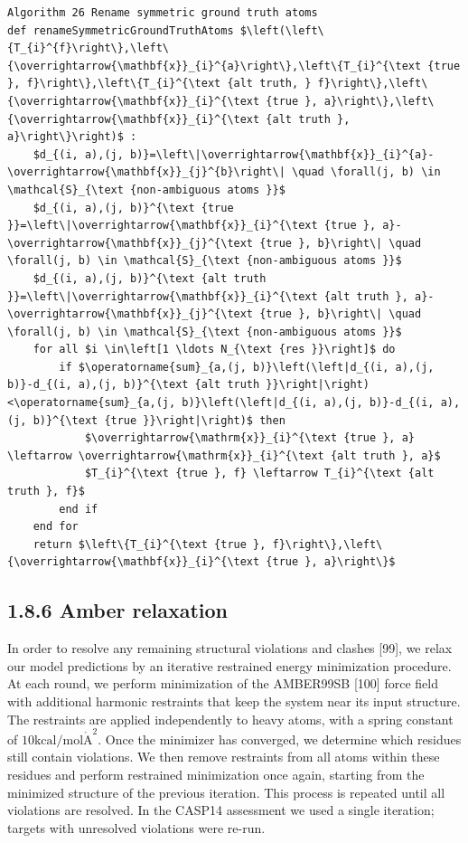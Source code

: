 \documentclass[10pt]{article}
\def\AA{\mathring{\mathrm{A}}}
\begin{document}
\begin{verbatim}
Algorithm 26 Rename symmetric ground truth atoms
def renameSymmetricGroundTruthAtoms $\left(\left\{T_{i}^{f}\right\},\left\{\overrightarrow{\mathbf{x}}_{i}^{a}\right\},\left\{T_{i}^{\text {true }, f}\right\},\left\{T_{i}^{\text {alt truth, } f}\right\},\left\{\overrightarrow{\mathbf{x}}_{i}^{\text {true }, a}\right\},\left\{\overrightarrow{\mathbf{x}}_{i}^{\text {alt truth }, a}\right\}\right)$ :
    $d_{(i, a),(j, b)}=\left\|\overrightarrow{\mathbf{x}}_{i}^{a}-\overrightarrow{\mathbf{x}}_{j}^{b}\right\| \quad \forall(j, b) \in \mathcal{S}_{\text {non-ambiguous atoms }}$
    $d_{(i, a),(j, b)}^{\text {true }}=\left\|\overrightarrow{\mathbf{x}}_{i}^{\text {true }, a}-\overrightarrow{\mathbf{x}}_{j}^{\text {true }, b}\right\| \quad \forall(j, b) \in \mathcal{S}_{\text {non-ambiguous atoms }}$
    $d_{(i, a),(j, b)}^{\text {alt truth }}=\left\|\overrightarrow{\mathbf{x}}_{i}^{\text {alt truth }, a}-\overrightarrow{\mathbf{x}}_{j}^{\text {true }, b}\right\| \quad \forall(j, b) \in \mathcal{S}_{\text {non-ambiguous atoms }}$
    for all $i \in\left[1 \ldots N_{\text {res }}\right]$ do
        if $\operatorname{sum}_{a,(j, b)}\left(\left|d_{(i, a),(j, b)}-d_{(i, a),(j, b)}^{\text {alt truth }}\right|\right)<\operatorname{sum}_{a,(j, b)}\left(\left|d_{(i, a),(j, b)}-d_{(i, a),(j, b)}^{\text {true }}\right|\right)$ then
            $\overrightarrow{\mathrm{x}}_{i}^{\text {true }, a} \leftarrow \overrightarrow{\mathrm{x}}_{i}^{\text {alt truth }, a}$
            $T_{i}^{\text {true }, f} \leftarrow T_{i}^{\text {alt truth }, f}$
        end if
    end for
    return $\left\{T_{i}^{\text {true }, f}\right\},\left\{\overrightarrow{\mathbf{x}}_{i}^{\text {true }, a}\right\}$
\end{verbatim}

\subsection*{1.8.6 Amber relaxation}
In order to resolve any remaining structural violations and clashes [99], we relax our model predictions by an iterative restrained energy minimization procedure. At each round, we perform minimization of the AMBER99SB [100] force field with additional harmonic restraints that keep the system near its input structure. The restraints are applied independently to heavy atoms, with a spring constant of $10 \mathrm{kcal} / \mathrm{mol} \AA^{2}$. Once the minimizer has converged, we determine which residues still contain violations. We then remove restraints from all atoms within these residues and perform restrained minimization once again, starting from the minimized structure of the previous iteration. This process is repeated until all violations are resolved. In the CASP14 assessment we used a single iteration; targets with unresolved violations were re-run.
\end{document}
